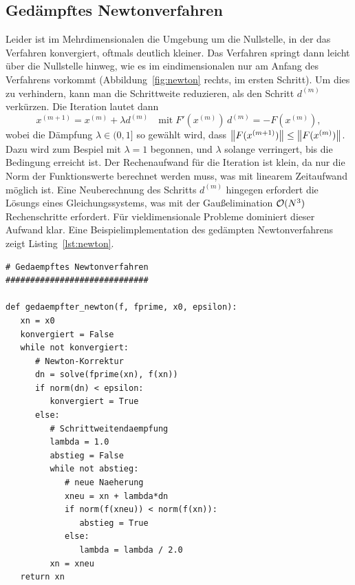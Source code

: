 \subsection{Gedämpftes Newtonverfahren}

Leider ist im Mehrdimensionalen die Umgebung um die Nullstelle, in der
das Verfahren konvergiert, oftmals deutlich kleiner. Das Verfahren
springt dann leicht über die Nullstelle hinweg, wie es im
eindimensionalen nur am Anfang des Verfahrens vorkommt
(\zb Abbildung~\ref{fig:newton} rechts, im ersten Schritt). Um dies
zu verhindern, kann man die Schrittweite reduzieren, als den Schritt
$d^{(m)}$ verkürzen. Die Iteration lautet dann
\begin{equation}
  x^{(m+1)} = x^{(m)} + \lambda d^{(m)}\quad\text{mit}\;
  F'(x^{(m)})\,d^{(m)} = -F(x^{(m)}),
\end{equation}
wobei die Dämpfung $\lambda\in (0,1]$ so gewählt wird, dass
$\left\lVert{F(x^{(m+1)})}\right\rVert\le\left\lVert{F(x^{(m)})}\right\rVert$. Dazu wird zum Bespiel mit
$\lambda=1$ begonnen, und $\lambda$ solange verringert, bis die
Bedingung erreicht ist. Der Rechenaufwand für die Iteration ist klein,
da nur die Norm der Funktionswerte berechnet werden muss, was mit
linearem Zeitaufwand möglich ist. Eine Neuberechnung des Schritts
$d^{(m)}$ hingegen erfordert die Lösungs eines Gleichungssystems, was
mit der Gaußelimination $\mathcal O(N^3)$ Rechenschritte erfordert. Für
vieldimensionale Probleme dominiert dieser Aufwand klar. Eine
Beispielimplementation des gedämpten Newtonverfahrens zeigt
Listing~\ref{lst:newton}.

\begin{lstlisting}[style=floating,float=t,deletekeywords={lambda},
caption={Gedämpftes Newtonverfahren in mehreren
Dimensionen. \lstinline!f(x)! muß
eine vektorwertige Funktion sein, \lstinline!fprime(x)! ihre
Ableitung, d.h. eine matrixwertige Funktion.},label={lst:newton}]
# Gedaempftes Newtonverfahren
#############################

def gedaempfter_newton(f, fprime, x0, epsilon):
   xn = x0
   konvergiert = False
   while not konvergiert:
      # Newton-Korrektur
      dn = solve(fprime(xn), f(xn))
      if norm(dn) < epsilon:
         konvergiert = True
      else:
         # Schrittweitendaempfung
         lambda = 1.0
         abstieg = False
         while not abstieg:
            # neue Naeherung
            xneu = xn + lambda*dn
            if norm(f(xneu)) < norm(f(xn)):
               abstieg = True
            else:
               lambda = lambda / 2.0
         xn = xneu
   return xn
\end{lstlisting}

